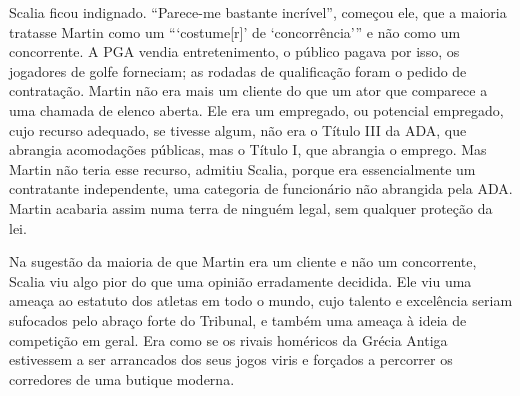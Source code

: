 \par
 
Scalia ficou indignado. “Parece-me bastante incrível”, começou ele, que a maioria tratasse Martin como um “‘costume[r]’ de ‘concorrência’” e não como um concorrente. A PGA vendia entretenimento, o público pagava por isso, os jogadores de golfe forneciam; as rodadas de qualificação foram o pedido de contratação. Martin não era mais um cliente do que um ator que comparece a uma chamada de elenco aberta. Ele era um empregado, ou potencial empregado, cujo recurso adequado, se tivesse algum, não era o Título III da ADA, que abrangia acomodações públicas, mas o Título I, que abrangia o emprego. Mas Martin não teria esse recurso, admitiu Scalia, porque era essencialmente um contratante independente, uma categoria de funcionário não abrangida pela ADA. Martin acabaria assim numa terra de ninguém legal, sem qualquer proteção da lei.
 
\par
 
Na sugestão da maioria de que Martin era um cliente e não um concorrente, Scalia viu algo pior do que uma opinião erradamente decidida. Ele viu uma ameaça ao estatuto dos atletas em todo o mundo, cujo talento e excelência seriam sufocados pelo abraço forte do Tribunal, e também uma ameaça à ideia de competição em geral. Era como se os rivais homéricos da Grécia Antiga estivessem a ser arrancados dos seus jogos viris e forçados a percorrer os corredores de uma butique moderna.
 
\par
 
